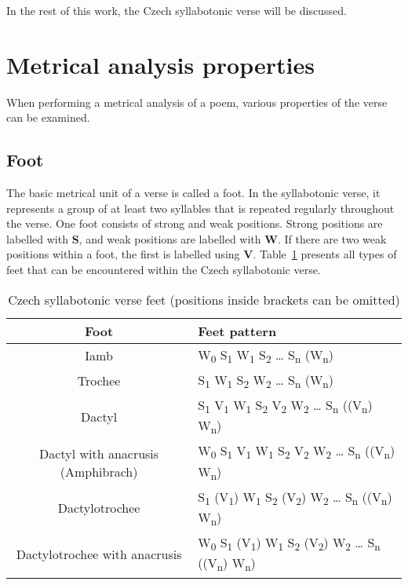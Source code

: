 In the rest of this work, the Czech syllabotonic verse will be discussed.

\section{Metrical analysis properties}
When performing a metrical analysis of a poem, various properties of the verse can be examined.

\subsection{Foot}
The basic metrical unit of a verse is called a foot. In the syllabotonic verse, it represents a group of at least two syllables that is repeated regularly throughout the verse. One foot consists of strong and weak positions. Strong positions are labelled with \textbf{S}, and weak positions are labelled with \textbf{W}. If there are two weak positions within a foot, the first is labelled using \textbf{V}. Table~\ref{tab:czech-syllabotonic-feet} presents all types of feet that can be encountered within the Czech syllabotonic verse.~\cite{UvodTeorieVerse}

\begin{table}[htpb]
\caption[Czech syllabotonic verse feet]{Czech syllabotonic verse feet (positions inside brackets can be omitted)}\label{tab:czech-syllabotonic-feet}
\centering
\begin{tabular}{|c||l|}\hline
    Foot & Feet pattern\\\hline\hline
    Iamb & W\textsubscript{0} S\textsubscript{1} W\textsubscript{1} S\textsubscript{2} \ldots{} S\textsubscript{n} (W\textsubscript{n})\\
    Trochee & S\textsubscript{1} W\textsubscript{1} S\textsubscript{2} W\textsubscript{2} \ldots{} S\textsubscript{n} (W\textsubscript{n})\\
    Dactyl & S\textsubscript{1} V\textsubscript{1} W\textsubscript{1} S\textsubscript{2} V\textsubscript{2} W\textsubscript{2} \ldots{} S\textsubscript{n} ((V\textsubscript{n}) W\textsubscript{n})\\
    Dactyl with anacrusis (Amphibrach) & W\textsubscript{0} S\textsubscript{1} V\textsubscript{1} W\textsubscript{1} S\textsubscript{2} V\textsubscript{2} W\textsubscript{2} \ldots{} S\textsubscript{n} ((V\textsubscript{n}) W\textsubscript{n})\\
    Dactylotrochee & S\textsubscript{1} (V\textsubscript{1}) W\textsubscript{1} S\textsubscript{2} (V\textsubscript{2}) W\textsubscript{2} \ldots{} S\textsubscript{n} ((V\textsubscript{n}) W\textsubscript{n})\\
    Dactylotrochee with anacrusis & W\textsubscript{0} S\textsubscript{1} (V\textsubscript{1}) W\textsubscript{1} S\textsubscript{2} (V\textsubscript{2}) W\textsubscript{2} \ldots{} S\textsubscript{n} ((V\textsubscript{n}) W\textsubscript{n})\\\hline
\end{tabular}
\end{table}

